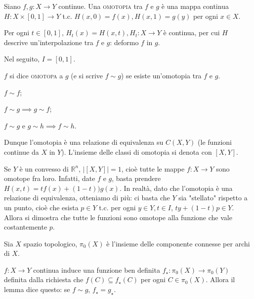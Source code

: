 \begin{defn}
  Siano $f, g:X \rightarrow Y$ continue. Una \textsc{omotopia} tra $f$ e $g$ è una mappa continua $H:X \times [0, 1] \rightarrow Y$ t.c. $H(x, 0)=f(x), H(x, 1)=g(y)$ per ogni $x \in X$.
\end{defn}

\begin{ftt}
  Per ogni $t \in [0, 1]$, $H_t(x)=H(x, t), H_t:X \rightarrow Y$ è continua, per cui $H$ descrive un'interpolazione tra $f$ e $g$: deformo $f$ in $g$.
\end{ftt}

Nel seguito, $I=[0, 1]$.

\begin{defn}
  $f$ si dice \textsc{omotopa} a $g$ (e si scrive $f \sim g$) se esiste un'omotopia tra $f$ e $g$.
\end{defn}

\begin{ftt}
  \begin{nlist}
    \item $f \sim f$;
    \item $f \sim g \implies g \sim f$;
    \item $f \sim g$ e $g \sim h \implies f \sim h$.
  \end{nlist}
  Dunque l'omotopia è una relazione di equivalenza su $C(X, Y)$ (le funzioni continue da $X$ in $Y$). L'insieme delle classi di omotopia si denota con $[X, Y]$.
\end{ftt}

\begin{ex}
  Se $Y$ è un convesso di $\mathbb{R}^n$, $\left|[X, Y]\right|=1$, cioè tutte le mappe $f:X \rightarrow Y$ sono omotope fra loro. Infatti, date $f$ e $g$, basta prendere $H(x, t)=tf(x)+(1-t))g(x)$. In realtà, dato che l'omotopia è una relazione di equivalenza, otteniamo di più: ci basta che $Y$ sia "stellato" rispetto a un punto, cioè che esista $p \in Y$ t.c. per ogni $y \in Y, t \in I$, $ty+(1-t)p \in Y$. Allora si dimostra che tutte le funzioni sono omotope alla funzione che vale costantemente $p$.
\end{ex}

\begin{defn}
  Sia $X$ spazio topologico, $\pi_0(X)$ è l'insieme delle componente connesse per archi di $X$.
\end{defn}

\begin{lm}
  $f:X \rightarrow Y$ continua induce una funzione ben definita $f_{\star}:\pi_0(X) \rightarrow \pi_0(Y)$ definita dalla richiesta che $f(C) \subseteq f_{\star}(C)$ per ogni $C \in \pi_0(X)$. Allora il lemma dice questo: se $f \sim g$, $f_{\star}=g_{\star}$.
\end{lm}

